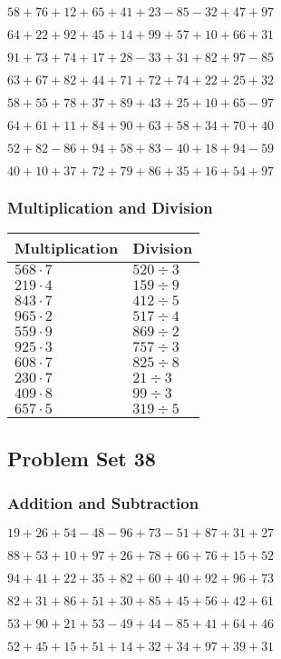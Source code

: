 \(58+76+12+65+41+23-85-32+47+97\)

\(64+22+92+45+14+99+57+10+66+31\)

\(91+73+74+17+28-33+31+82+97-85\)

\(63+67+82+44+71+72+74+22+25+32\)

\(58+55+78+37+89+43+25+10+65-97\)

\(64+61+11+84+90+63+58+34+70+40\)

\(52+82-86+94+58+83-40+18+94-59\)

\(40+10+37+72+79+86+35+16+54+97\)

\hypertarget{multiplication-and-division-36}{%
\subsubsection{Multiplication and
Division}\label{multiplication-and-division-36}}

\begin{longtable}[]{@{}ll@{}}
\toprule
Multiplication & Division\tabularnewline
\midrule
\endhead
\(568\cdot7\) & \(520÷3\)\tabularnewline
\(219\cdot4\) & \(159÷9\)\tabularnewline
\(843\cdot7\) & \(412÷5\)\tabularnewline
\(965\cdot2\) & \(517÷4\)\tabularnewline
\(559\cdot9\) & \(869÷2\)\tabularnewline
\(925\cdot3\) & \(757÷3\)\tabularnewline
\(608\cdot7\) & \(825÷8\)\tabularnewline
\(230\cdot7\) & \(21÷3\)\tabularnewline
\(409\cdot8\) & \(99÷3\)\tabularnewline
\(657\cdot5\) & \(319÷5\)\tabularnewline
\bottomrule
\end{longtable}

\hypertarget{problem-set-38}{%
\subsection{Problem Set 38}\label{problem-set-38}}

\hypertarget{addition-and-subtraction-37}{%
\subsubsection{Addition and
Subtraction}\label{addition-and-subtraction-37}}

\(19+26+54-48-96+73-51+87+31+27\)

\(88+53+10+97+26+78+66+76+15+52\)

\(94+41+22+35+82+60+40+92+96+73\)

\(82+31+86+51+30+85+45+56+42+61\)

\(53+90+21+53-49+44-85+41+64+46\)

\(52+45+15+51+14+32+34+97+39+31\)

